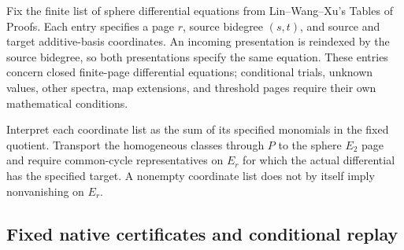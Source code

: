\begin{definition}
  \label{def:lin-proofs-sphere-table}
  Fix the finite list of sphere differential equations from
  Lin--Wang--Xu's Tables of Proofs. Each entry specifies a page $r$,
  source bidegree $(s,t)$, and source and target additive-basis
  coordinates. An incoming presentation is reindexed by the source
  bidegree, so both presentations specify the same equation.
  These entries concern closed finite-page differential equations;
  conditional trials, unknown values, other spectra, map extensions,
  and threshold pages require their own mathematical conditions.
\end{definition}

\begin{definition}
  \label{def:lin-proofs-sphere-meaning}
  \notready
  Interpret each coordinate list as the sum of its specified monomials
  in the fixed quotient. Transport the homogeneous classes through $P$
  to the sphere $E_2$ page and require common-cycle representatives on
  $E_r$ for which the actual differential has the specified target.
  A nonempty coordinate list does not by itself imply nonvanishing
  on $E_r$.
\end{definition}

\subsection{Fixed native certificates and conditional replay}

